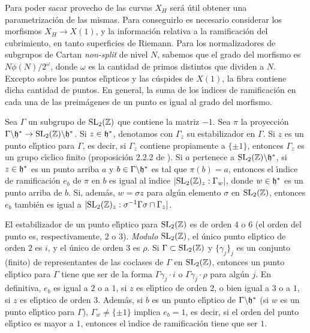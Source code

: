 
Para poder sacar provecho de las curvas $X_{H}$ ser\'{a} \'{u}til obtener una
parametrizaci\'{o}n de las mismas. Para conseguirlo es necesario considerar los
morfismos $X_{H}\rightarrow X(1)$, y la informaci\'{o}n relativa a la
ramificaci\'{o}n del cubrimiento, en tanto superficies de Riemann. Para los
normalizadores de subgrupos de Cartan \textit{non-split} de nivel $N$, sabemos que
el grado del morfismo es $N\phi(N)/2^{\omega}$, donde $\omega$ es la cantidad de
primos distintos que dividen a $N$. Excepto sobre los puntos el\'{\i}pticos y las
c\'{u}spides de $X(1)$, la fibra contiene dicha cantidad de puntos. En general, la
suma de los \'{\i}ndices de ramificaci\'{o}n en cada una de las preim\'{a}genes de
un punto es igual al grado del morfismo.

Sea $\Gamma$ un subgrupo de $\SL{2}(\bb{Z})$ que contiene la matriz $-1$.
Sea $\pi$ la proyecci\'{o}n
$\Gamma\backs\frak{h}^{*}\rightarrow \SL{2}(\bb{Z})\backs\frak{h}^{*}$. Si
$z\in\frak{h}^{*}$, denotamos con $\Gamma_{z}$ su estabilizador en $\Gamma$.
Si $z$ es un punto el\'{\i}ptico para $\Gamma$, es decir, si $\Gamma_{z}$
contiene propiamente a $\{\pm 1\}$, entonces $\Gamma_{z}$ es un grupo
c\'{\i}clico finito (proposici\'{o}n 2.2.2 de \cite{diamondShurman}). Si
$a$ pertenece a $\SL{2}(\bb{Z})\backs\frak{h}^{*}$, si $z\in\frak{h}^{*}$ es un
punto arriba $a$ y $b\in\Gamma\backs\frak{h}^{*}$ es tal que $\pi(b)=a$, entonces
el \'{\i}ndice de ramificaci\'{o}n $e_{b}$ de $\pi$ en $b$ es igual al
\'{\i}ndice $|\SL{2}(\bb{Z})_{z}:\Gamma_{w}|$, donde $w\in\frak{h}^{*}$ es un
punto arriba de $b$. Si, adem\'{a}s, $w=\sigma z$ para alg\'{u}n elemento
$\sigma$ en $\SL{2}(\bb{Z})$, entonces $e_{b}$ tambi\'{e}n es igual a
$|\SL{2}(\bb{Z})_{z}:\sigma^{-1}\Gamma\sigma\cap\Gamma_{z}|$.

El estabilizador de un punto el\'{\i}ptico para $\SL{2}(\bb{Z})$ es de orden
$4$ o $6$ (el orden del punto es, respectivamente, $2$ o $3$). \textit{Modulo}
$\SL{2}(\bb{Z})$, el \'{u}nico punto el\'{\i}ptico de orden $2$ es $i$, y el
\'{u}nico de orden $3$ es $\rho$. Si $\Gamma\subset\SL{2}(\bb{Z})$ y
$\{\gamma_{j}\}_{j}$ es un conjunto (finito) de representantes de las coclases
de $\Gamma$ en $\SL{2}(\bb{Z})$, entonces un punto el\'{\i}ptico para $\Gamma$
tiene que ser de la forma $\Gamma\gamma_{j}\cdot i$ o $\Gamma\gamma_{j}\cdot\rho$
para alg\'{u}n $j$. En definitiva, $e_{b}$ es igual a $2$ o a $1$, si $z$
es el\'{\i}ptico de orden $2$, o bien igual a $3$ o a $1$, si $z$ es el\'{\i}ptico
de orden $3$. Adem\'{a}s, si $b$ es un punto el\'{\i}ptico de
$\Gamma\backs\frak{h}^{*}$ (si $w$ es un punto el\'{\i}ptico para $\Gamma$),
$\Gamma_{w}\not =\{\pm 1\}$ implica $e_{b}=1$, es decir, si el orden del punto
el\'{\i}ptico es mayor a $1$, entonces el \'{\i}ndice de ramificaci\'{o}n tiene
que ser $1$.

